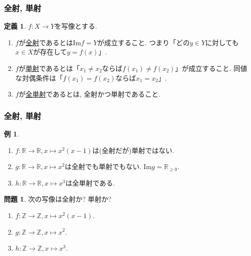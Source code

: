 \documentclass[dvipdfmx,cjk,10.2pt]{beamer}
\newcommand{\R}{\mathbb{R}}
\newcommand{\Z}{\mathbb{Z}}
\newcommand{\Imag}{\mathrm{Im}}
\theoremstyle{definition}
\newtheorem{Ex}[Thm]{例}
\newtheorem{Def}[Thm]{定義}
\newtheorem{Prob}[Thm]{問題}
\begin{document}
\begin{frame}
\frametitle{全射, 単射}


\begin{Def}$f:X\rightarrow Y$を写像とする. 
\begin{enumerate}
\item $f$が\underline{全射}であるとは$\Imag f = Y$が成立すること. 
つまり「どの$y \in Y$に対しても$x \in X$が存在して$y=f(x)$」. 
\item $f$が\underline{単射}であるとは「$x_1\ne x_2$ならば$f(x_1)\ne f(x_2)$」が成立すること. 
同値な対偶条件は「$f(x_1)= f(x_2)$ならば$x_1= x_2$」.  
\item $f$が\underline{全単射}であるとは, 全射かつ単射であること. 
\end{enumerate}
\end{Def}



\end{frame}



\begin{frame}
\frametitle{全射, 単射}

\begin{Ex}
\begin{enumerate}
\item $f:\R \rightarrow \R, x \mapsto x^2(x-1)$は(全射だが)単射ではない. 
\item $g:\R \rightarrow \R, x \mapsto x^2$は全射でも単射でもない. $\Imag g=\R_{\ge 0}$. 
\item $h:\R \rightarrow \R, x \mapsto x^3$は全単射である. 
\end{enumerate}
\end{Ex}


\begin{Prob}
次の写像は全射か? 単射か? 
\begin{enumerate}
\item $f:\Z \rightarrow \Z, x \mapsto x^2(x-1)$.  
\item $g:\Z \rightarrow \Z, x \mapsto x^2$.
\item $h:\Z \rightarrow \Z, x \mapsto x^3$. 
\end{enumerate}
\end{Prob}



\end{frame}
\end{document}
